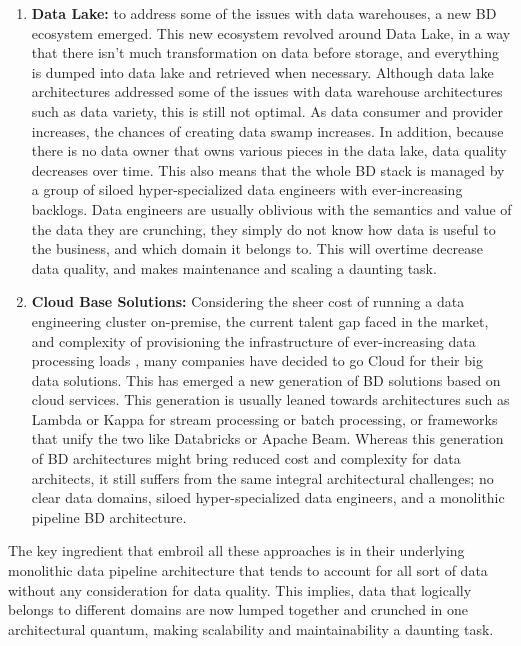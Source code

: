 \documentclass[runningheads]{llncs}
\begin{document}
\begin{enumerate}
    
    \item \textbf{Data Lake:} to address some of the issues with data warehouses, a new BD ecosystem emerged. This new ecosystem revolved around Data Lake, in a way that there isn't much transformation on data before storage, and everything is dumped into data lake and retrieved when necessary. Although data lake architectures addressed some of the issues with data warehouse architectures such as data variety, this is still not optimal. As data consumer and provider increases, the chances of creating data swamp increases. In addition, because there is no data owner that owns various pieces in the data lake, data quality decreases over time. This also means that the whole BD stack is managed by a group of siloed hyper-specialized data engineers with ever-increasing backlogs. Data engineers are usually oblivious with the semantics and value of the data they are crunching, they simply do not know how data is useful to the business, and which domain it belongs to. This will overtime decrease data quality, and makes maintenance and scaling a daunting task. 
    \item \textbf{Cloud Base Solutions:} Considering the sheer cost of running a data engineering cluster on-premise, the current talent gap faced in the market, and complexity of provisioning the infrastructure of ever-increasing data processing loads \cite{AtaeiHype}, many companies have decided to go Cloud for their big data solutions. This has emerged a new generation of BD solutions based on cloud services. This generation is usually leaned towards architectures such as Lambda or Kappa for stream processing or batch processing, or frameworks that unify the two like Databricks or Apache Beam. Whereas this generation of BD architectures might bring reduced cost and complexity for data architects, it still suffers from the same integral architectural challenges; no clear data domains, siloed hyper-specialized data engineers, and a monolithic pipeline BD architecture.
\end{enumerate}

The key ingredient that embroil all these approaches is in their underlying monolithic data pipeline architecture that tends to account for all sort of data without any consideration for data quality. This implies, data that logically belongs to different domains are now lumped together and crunched in one architectural quantum, making scalability and maintainability a daunting task. 

\end{document}
